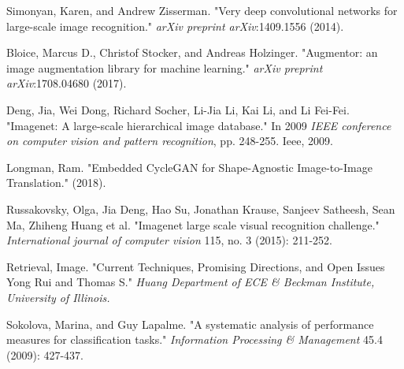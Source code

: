 \documentclass[12pt]{report}
\begin{document}
\begin{thebibliography}{9}
			Simonyan, Karen, and Andrew Zisserman. "Very deep convolutional networks for large-scale image recognition." \textit{arXiv preprint arXiv}:1409.1556 (2014).
																																						
			Bloice, Marcus D., Christof Stocker, and Andreas Holzinger. "Augmentor: an image augmentation library for machine learning." \textit{arXiv preprint arXiv}:1708.04680 (2017).
			
			Deng, Jia, Wei Dong, Richard Socher, Li-Jia Li, Kai Li, and Li Fei-Fei. "Imagenet: A large-scale hierarchical image database." In 2009 \textit{IEEE conference on computer vision and pattern recognition}, pp. 248-255. Ieee, 2009.
			
			Longman, Ram. "Embedded CycleGAN for Shape-Agnostic Image-to-Image Translation." (2018).																																					
			
			Russakovsky, Olga, Jia Deng, Hao Su, Jonathan Krause, Sanjeev Satheesh, Sean Ma, Zhiheng Huang et al. "Imagenet large scale visual recognition challenge." \textit{International journal of computer vision} 115, no. 3 (2015): 211-252.																		
			
			Retrieval, Image. "Current Techniques, Promising Directions, and Open Issues Yong Rui and Thomas S." \textit{Huang Department of ECE \& Beckman Institute, University of Illinois.}		
			
			
			Sokolova, Marina, and Guy Lapalme. "A systematic analysis of performance measures for classification tasks." \textit{Information Processing \& Management} 45.4 (2009): 427-437.
			
		
		
		\end{thebibliography}
																																																																										
\end{document}
